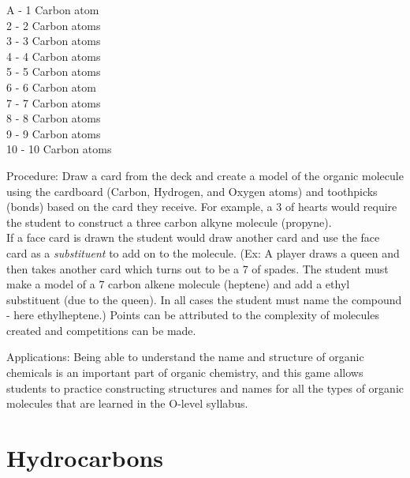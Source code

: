 \begin{multicols}{2}
\begin{description*}
{A - 1 Carbon atom\\
2 - 2 Carbon atoms\\
3 - 3 Carbon atoms\\
4 - 4 Carbon atoms\\
5 - 5 Carbon atoms\\
6 - 6 Carbon atom\\
7 - 7 Carbon atoms\\
8 - 8 Carbon atoms\\
9 - 9 Carbon atoms\\
10 - 10 Carbon atoms\\}
\item[Procedure:]{Draw a card from the deck and create a model of the organic molecule using the cardboard (Carbon, Hydrogen, and Oxygen atoms) and toothpicks (bonds) based on the card they receive. For example, a 3 of hearts would require the student to construct a three carbon alkyne molecule (propyne). \\

If a face card is drawn the student would draw another card and use the face card as a \emph{substituent} to add on to the molecule. (Ex: A player draws a queen and then takes another card which turns out to be a 7 of spades. The student must make a model of a 7 carbon alkene molecule (heptene) and add a ethyl substituent (due to the queen). In all cases the student must name the compound - here ethylheptene.) Points can be attributed to the complexity of molecules created and competitions can be made.}
\item[Applications:]{Being able to understand the name and structure of organic chemicals is an important part of organic chemistry, and this game allows students to practice constructing structures and names for all the types of organic molecules that are learned in the O-level syllabus.}
\end{description*}

\columnbreak


\section*{Hydrocarbons}



\end{multicols}
